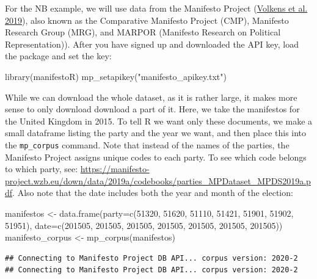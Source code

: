 \documentclass[
]{book}
\newenvironment{Shaded}{\begin{snugshade}}{\end{snugshade}}
\newcommand{\AttributeTok}[1]{\textcolor[rgb]{0.77,0.63,0.00}{#1}}
\newcommand{\DecValTok}[1]{\textcolor[rgb]{0.00,0.00,0.81}{#1}}
\newcommand{\FunctionTok}[1]{\textcolor[rgb]{0.00,0.00,0.00}{#1}}
\newcommand{\NormalTok}[1]{#1}
\newcommand{\OtherTok}[1]{\textcolor[rgb]{0.56,0.35,0.01}{#1}}
\newcommand{\StringTok}[1]{\textcolor[rgb]{0.31,0.60,0.02}{#1}}
\begin{document}
For the NB example, we will use data from the Manifesto Project (\protect\hyperlink{ref-Volkens2019a}{Volkens et al. 2019}), also known as the Comparative Manifesto Project (CMP), Manifesto Research Group (MRG), and MARPOR (Manifesto Research on Political Representation)). After you have signed up and downloaded the API key, load the package and set the key:

\begin{Shaded}
\begin{Highlighting}[]
\FunctionTok{library}\NormalTok{(manifestoR)}
\FunctionTok{mp\_setapikey}\NormalTok{(}\StringTok{"manifesto\_apikey.txt"}\NormalTok{)}
\end{Highlighting}
\end{Shaded}

While we can download the whole dataset, as it is rather large, it makes more sense to only download download a part of it. Here, we take the manifestos for the United Kingdom in 2015. To tell R we want only these documents, we make a small dataframe listing the party and the year we want, and then place this into the \texttt{mp\_corpus} command. Note that instead of the names of the parties, the Manifesto Project assigns unique codes to each party. To see which code belongs to which party, see: \url{https://manifesto-project.wzb.eu/down/data/2019a/codebooks/parties_MPDataset_MPDS2019a.pdf}. Also note that the date includes both the year and month of the election:

\begin{Shaded}
\begin{Highlighting}[]
\NormalTok{manifestos }\OtherTok{\textless{}{-}} \FunctionTok{data.frame}\NormalTok{(}\AttributeTok{party=}\FunctionTok{c}\NormalTok{(}\DecValTok{51320}\NormalTok{, }\DecValTok{51620}\NormalTok{, }\DecValTok{51110}\NormalTok{, }\DecValTok{51421}\NormalTok{, }\DecValTok{51901}\NormalTok{, }\DecValTok{51902}\NormalTok{, }\DecValTok{51951}\NormalTok{), }\AttributeTok{date=}\FunctionTok{c}\NormalTok{(}\DecValTok{201505}\NormalTok{, }\DecValTok{201505}\NormalTok{, }\DecValTok{201505}\NormalTok{, }\DecValTok{201505}\NormalTok{, }\DecValTok{201505}\NormalTok{, }\DecValTok{201505}\NormalTok{, }\DecValTok{201505}\NormalTok{))}
\NormalTok{manifesto\_corpus }\OtherTok{\textless{}{-}} \FunctionTok{mp\_corpus}\NormalTok{(manifestos)}
\end{Highlighting}
\end{Shaded}

\begin{verbatim}
## Connecting to Manifesto Project DB API... corpus version: 2020-2 
## Connecting to Manifesto Project DB API... corpus version: 2020-2
\end{verbatim}
\end{document}
